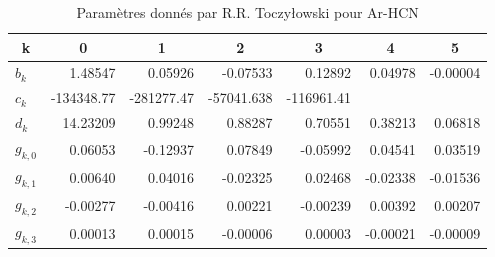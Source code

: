 \documentclass[11pt, a4paper, openany]{report}
\begin{document}
\begin{table}[H]
  \caption{Paramètres donnés par R.R. Toczyłowski \cite{these} pour Ar-HCN}\label{tab:params_toczylowski}
  \begin{center}
    \begin{tabular}[c]{lrrrrrr}
      \hline
      \multicolumn{1}{c}{\textbf{k}} & 
      \multicolumn{1}{c}{\textbf{0}} & 
      \multicolumn{1}{c}{\textbf{1}} & 
      \multicolumn{1}{c}{\textbf{2}} & 
      \multicolumn{1}{c}{\textbf{3}} & 
      \multicolumn{1}{c}{\textbf{4}} & 
      \multicolumn{1}{c}{\textbf{5}} \\
      \hline
      $b_k$ & 1.48547 &  0.05926 & -0.07533 & 0.12892 & 0.04978 & -0.00004 \\
      $c_k$ & -134348.77 &  -281277.47 &  -57041.638 & -116961.41 \\
      $d_k$ &  14.23209 & 0.99248 & 0.88287 & 0.70551 &  0.38213 & 0.06818\\
      $g_{k,0}$ & 0.06053 & -0.12937 &  0.07849 & -0.05992 & 0.04541 & 0.03519 \\
      $g_{k,1}$ & 0.00640 & 0.04016 & -0.02325 & 0.02468 & -0.02338 & -0.01536 \\
      $g_{k,2}$ & -0.00277 & -0.00416 & 0.00221 & -0.00239 & 0.00392 & 0.00207 \\
      $g_{k,3}$ & 0.00013 & 0.00015 & -0.00006 & 0.00003 & -0.00021 & -0.00009  \\
      
      \hline
    \end{tabular}
  \end{center}
\end{table}
\end{document}
